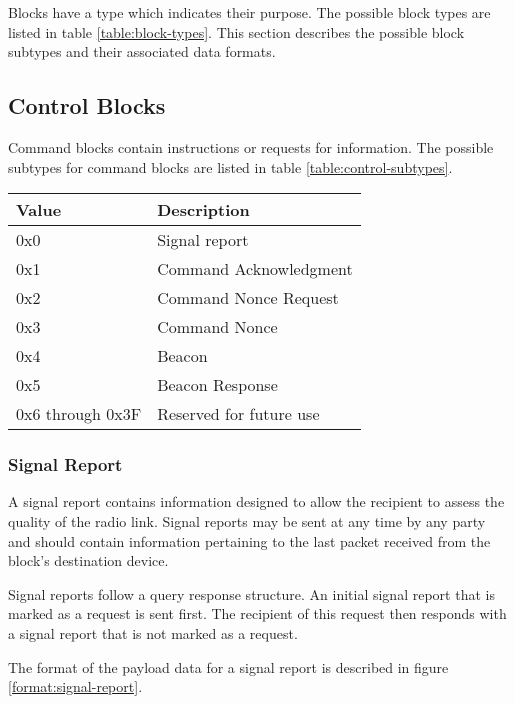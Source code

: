 Blocks have a type which indicates their purpose. The possible block types are listed in table \ref{table:block-types}.
This section describes the possible block subtypes and their associated data formats.

\subsection{Control Blocks}
Command blocks contain instructions or requests for information. The possible subtypes for command blocks are listed in
table \ref{table:control-subtypes}.

\begin{table*}[htb]
    \centering
    \begin{tabular}{@{}ll@{}}
        \toprule
        Value            & Description             \\
        \midrule
        0x0              & Signal report           \\
        0x1              & Command Acknowledgment  \\
        0x2              & Command Nonce Request   \\
        0x3              & Command Nonce           \\
        0x4              & Beacon                  \\
        0x5              & Beacon Response         \\
        0x6 through 0x3F & Reserved for future use \\
        \bottomrule
    \end{tabular}
    \caption{Control Block Subtypes}
    \label{table:control-subtypes}
\end{table*}

\subsubsection{Signal Report}
A signal report contains information designed to allow the recipient to assess the quality of the radio link. Signal
reports may be sent at any time by any party and should contain information pertaining to the last packet received from
the block's destination device.

Signal reports follow a query response structure. An initial signal report that is marked as a request is sent first.
The recipient of this request then responds with a signal report that is not marked as a request.

The format of the payload data for a signal report is described in figure \ref{format:signal-report}.

